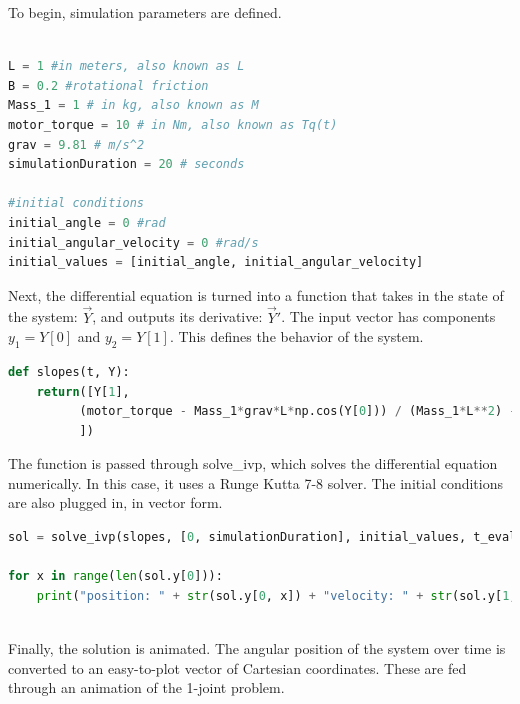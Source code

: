 \documentclass{article}
\begin{document}
\noindent \justifying To begin, simulation parameters are defined.
\begin{lstlisting}[language=Python]

L = 1 #in meters, also known as L
B = 0.2 #rotational friction
Mass_1 = 1 # in kg, also known as M
motor_torque = 10 # in Nm, also known as Tq(t)
grav = 9.81 # m/s^2
simulationDuration = 20 # seconds

#initial conditions
initial_angle = 0 #rad
initial_angular_velocity = 0 #rad/s
initial_values = [initial_angle, initial_angular_velocity]

\end{lstlisting}

\vspace{24pt}

\noindent \justifying Next, the differential equation is turned into a function that takes in the state of the system: $\vec{Y}$, and outputs its derivative: $\vec{Y}'$. The input vector has components $y_1 = Y[0]$ and $y_2 = Y[1]$. This defines the behavior of the system. 
\vspace{24pt}

\begin{lstlisting}[language=Python]
def slopes(t, Y): 
    return([Y[1],        
          (motor_torque - Mass_1*grav*L*np.cos(Y[0])) / (Mass_1*L**2) - B*Y[1]
          ])
\end{lstlisting}

\vspace{24pt}
\noindent \justifying The function is passed through solve\_ivp, which solves the differential equation numerically. In this case, it uses a Runge Kutta 7-8 solver. The initial conditions are also plugged in, in vector form.
\vspace{24pt}

\begin{lstlisting}[language=Python]
sol = solve_ivp(slopes, [0, simulationDuration], initial_values, t_eval=T, method = 'DOP853', rtol=1e-8, atol=1e-8)

for x in range(len(sol.y[0])):
    print("position: " + str(sol.y[0, x]) + "velocity: " + str(sol.y[1, x]))
    
\end{lstlisting}

\vspace{24pt}
% 

\noindent \justifying Finally, the solution is animated. The angular position of the system over time is converted to an easy-to-plot vector of Cartesian coordinates. These are fed through an animation of the 1-joint problem. 
\vspace{24pt}
\end{document}
